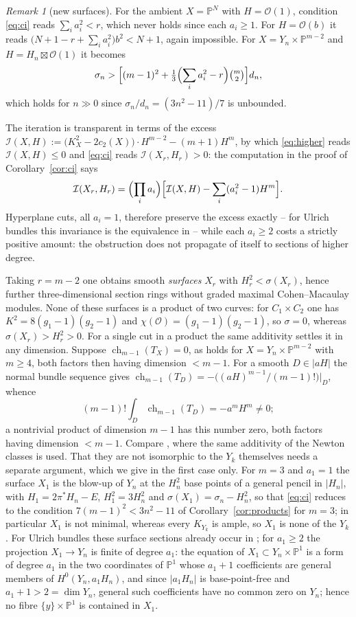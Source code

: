 \documentclass[11pt]{amsart}
\theoremstyle{remark}
\newtheorem{remark}[theorem]{Remark}
\theoremstyle{definition}
\newcommand{\PP}{\mathbb{P}}
\newcommand{\cO}{\mathcal{O}}
\begin{document}
\begin{remark}[new surfaces]\label{rem:ci}
For the ambient $X=\PP^N$ with $H=\cO(1)$, condition \eqref{eq:ci} reads $\sum_ia_i^2<r$, which never holds since each $a_i\ge1$. For $H=\cO(b)$ it reads $\bigl(N+1-r+\sum_ia_i^2\bigr)b^2<N+1$, again impossible. For $X=Y_n\times\PP^{m-2}$ and $H=H_n\boxtimes\cO(1)$ it becomes
\[
\sigma_n>\Bigl[(m-1)^2+\tfrac13\Bigl(\sum_ia_i^2-r\Bigr)\tbinom m2\Bigr]d_n ,
\]
which holds for $n\gg0$ since $\sigma_n/d_n=(3n^2-11)/7$ is unbounded.

The iteration is transparent in terms of the excess $\mathcal I(X,H):=\bigl(K_X^2-2c_2(X)\bigr)\cdot H^{m-2}-(m+1)H^m$, by which \eqref{eq:higher} reads $\mathcal I(X,H)\le0$ and \eqref{eq:ci} reads $\mathcal I(X_r,H_r)>0$: the computation in the proof of Corollary~\ref{cor:ci} says
\[
\mathcal I(X_r,H_r)=\Bigl(\prod_ia_i\Bigr)\Bigl[\mathcal I(X,H)-\sum_i(a_i^2-1)H^m\Bigr] .
\]
Hyperplane cuts, all $a_i=1$, therefore preserve the excess exactly -- for Ulrich bundles this invariance is the equivalence in \cite[Lem.~3.1]{Lo} -- while each $a_i\ge2$ costs a strictly positive amount: the obstruction does not propagate of itself to sections of higher degree.

Taking $r=m-2$ one obtains smooth \emph{surfaces} $X_r$ with $H_r^2<\sigma(X_r)$, hence further three-dimensional section rings without graded maximal Cohen--Macaulay modules. None of these surfaces is a product of two curves: for $C_1\times C_2$ one has $K^2=8(g_1-1)(g_2-1)$ and $\chi(\cO)=(g_1-1)(g_2-1)$, so $\sigma=0$, whereas $\sigma(X_r)>H_r^2>0$. For a single cut in a product the same additivity settles it in any dimension. Suppose $\operatorname{ch}_{m-1}(T_X)=0$, as holds for $X=Y_n\times\PP^{m-2}$ with $m\ge4$, both factors then having dimension $<m-1$. For a smooth $D\in|aH|$ the normal bundle sequence gives $\operatorname{ch}_{m-1}(T_D)=-\bigl((aH)^{m-1}/(m-1)!\bigr)|_D$, whence
\[
(m-1)!\int_D\operatorname{ch}_{m-1}(T_D)=-a^mH^m\ne0 ;
\]
a nontrivial product of dimension $m-1$ has this number zero, both factors having dimension $<m-1$. Compare \cite[Lem.~2.1]{Lo}, where the same additivity of the Newton classes is used. That they are not isomorphic to the $Y_k$ themselves needs a separate argument, which we give in the first case only. For $m=3$ and $a_1=1$ the surface $X_1$ is the blow-up of $Y_n$ at the $H_n^2$ base points of a general pencil in $|H_n|$, with $H_1=2\pi^*H_n-E$, $H_1^2=3H_n^2$ and $\sigma(X_1)=\sigma_n-H_n^2$, so that \eqref{eq:ci} reduces to the condition $7(m-1)^2<3n^2-11$ of Corollary~\ref{cor:products} for $m=3$; in particular $X_1$ is not minimal, whereas every $K_{Y_k}$ is ample, so $X_1$ is none of the $Y_k$. For Ulrich bundles these surface sections already occur in \cite[Thm.~1]{Lo}; for $a_1\ge2$ the projection $X_1\to Y_n$ is finite of degree $a_1$: the equation of $X_1\subset Y_n\times\PP^1$ is a form of degree $a_1$ in the two coordinates of $\PP^1$ whose $a_1+1$ coefficients are general members of $H^0(Y_n,a_1H_n)$, and since $|a_1H_n|$ is base-point-free and $a_1+1>2=\dim Y_n$, general such coefficients have no common zero on $Y_n$; hence no fibre $\{y\}\times\PP^1$ is contained in $X_1$.
\end{remark}
\end{document}
